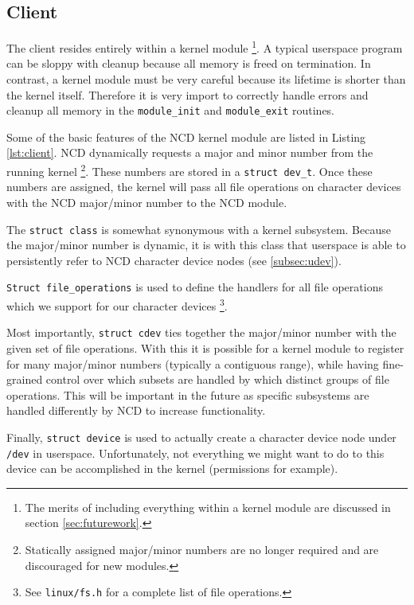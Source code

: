 \documentclass[11pt,twocolumn]{article}
\begin{document}
\subsection{Client}



The client resides entirely within a kernel module \footnote{The merits
of including everything within a kernel module are discussed in section
\ref{sec:futurework}.}. A typical userspace program can be sloppy
with cleanup because all memory is freed on termination. In contrast, a
kernel module must be very careful because its lifetime is shorter than
the kernel itself. Therefore it is very import to correctly handle
errors and cleanup all memory in the \texttt{module\_init} and
\texttt{module\_exit} routines.

Some of the basic features of the NCD kernel module are listed in
Listing \ref{lst:client}. NCD dynamically requests a major and
minor number from the running kernel \footnote{Statically assigned
major/minor numbers are no longer required and are discouraged for new
modules.}. These numbers are stored in a \texttt{struct dev\_t}. Once
these numbers are assigned, the kernel will pass all file operations on
character devices with the NCD major/minor number to the NCD module.

The \texttt{struct class} is somewhat synonymous with a kernel
subsystem. Because the major/minor number is dynamic, it is with this
class that userspace is able to persistently refer to NCD character
device nodes (see \ref{subsec:udev}).

\texttt{Struct file\_operations} is used to define the handlers for all
file operations which we support for our character devices \footnote{See
\texttt{linux/fs.h} for a complete list of file operations.}.

Most importantly, \texttt{struct cdev} ties together the major/minor
number with the given set of file operations. With this it is possible
for a kernel module to register for many major/minor numbers (typically
a contiguous range), while having fine-grained control over which
subsets are handled by which distinct groups of file operations. This
will be important in the future as specific subsystems are handled
differently by NCD to increase functionality.

Finally, \texttt{struct device} is used to actually create a character
device node under \texttt{/dev} in userspace. Unfortunately, not
everything we might want to do to this device can be accomplished in the
kernel (permissions for example).
\end{document}
